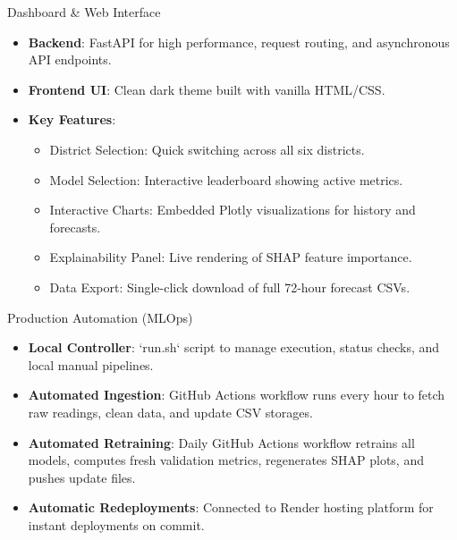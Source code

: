 \documentclass[aspectratio=169]{beamer}
\begin{document}
\begin{frame}{Dashboard \& Web Interface}
  \begin{itemize}
    \item \textbf{Backend}: FastAPI for high performance, request routing, and asynchronous API endpoints.
    \item \textbf{Frontend UI}: Clean dark theme built with vanilla HTML/CSS.
    \item \textbf{Key Features}:
      \begin{itemize}
        \item District Selection: Quick switching across all six districts.
        \item Model Selection: Interactive leaderboard showing active metrics.
        \item Interactive Charts: Embedded Plotly visualizations for history and forecasts.
        \item Explainability Panel: Live rendering of SHAP feature importance.
        \item Data Export: Single-click download of full 72-hour forecast CSVs.
      \end{itemize}
  \end{itemize}
\end{frame}

\begin{frame}{Production Automation (MLOps)}
  \begin{itemize}
    \item \textbf{Local Controller}: `run.sh` script to manage execution, status checks, and local manual pipelines.
    \item \textbf{Automated Ingestion}: GitHub Actions workflow runs every hour to fetch raw readings, clean data, and update CSV storages.
    \item \textbf{Automated Retraining}: Daily GitHub Actions workflow retrains all models, computes fresh validation metrics, regenerates SHAP plots, and pushes update files.
    \item \textbf{Automatic Redeployments}: Connected to Render hosting platform for instant deployments on commit.
  \end{itemize}
\end{frame}
\end{document}
